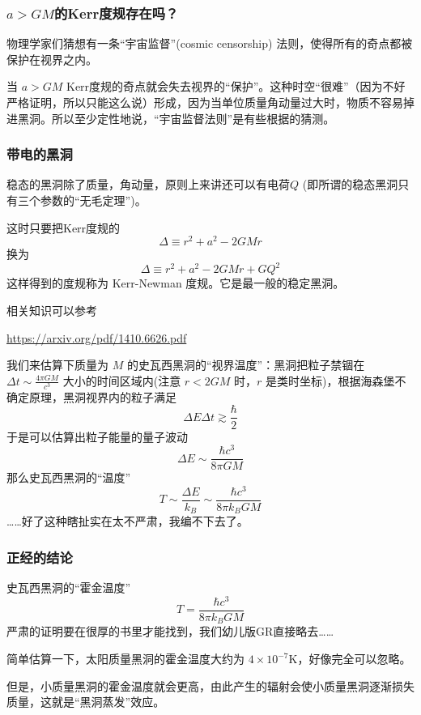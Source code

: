 \documentclass[CJK,13pt]{beamer}
\begin{document}
  \begin{frame}
    \frametitle{$a>GM$的Kerr度规存在吗？}
    物理学家们猜想有一条“宇宙监督”(cosmic censorship) 法则，使得所有的奇点都被保护在视界之内。

    \skipline
    
    当 $a>GM$ Kerr度规的奇点就会失去视界的“保护”。这种时空“很难”（因为不好严格证明，所以只能这么说）形成，因为当单位质量角动量过大时，物质不容易掉进黑洞。所以至少定性地说，“宇宙监督法则”是有些根据的猜测。
  \end{frame}  


    \begin{frame}
      \frametitle{带电的黑洞}
      稳态的黑洞除了质量，角动量，原则上来讲还可以有电荷$Q$ (即所谓的稳态黑洞只有三个参数的“无毛定理”)。

      这时只要把Kerr度规的
      $$\Delta \equiv r^2+a^2-2GMr$$
      换为
      $$\Delta \equiv r^2+a^2-2GMr+GQ^2$$
      这样得到的度规称为 Kerr-Newman 度规。它是最一般的稳定黑洞。


      \skipline

      相关知识可以参考

      \url{https://arxiv.org/pdf/1410.6626.pdf}
  \end{frame}  

    
    \begin{frame}
      我们来估算下质量为 $M$ 的史瓦西黑洞的“视界温度”：黑洞把粒子禁锢在 $\Delta t\sim \frac{4\pi GM}{c^3}$ 大小的时间区域内(注意 $r<2GM$ 时，$r$ 是类时坐标)，根据海森堡不确定原理，黑洞视界内的粒子满足
      $$\Delta E \Delta t \gtrsim \frac{\hbar}{2}$$
      于是可以估算出粒子能量的量子波动
      $$\Delta E \sim \frac{\hbar c^3}{8\pi GM}$$
      那么史瓦西黑洞的``温度''
      $$T \sim \frac{\Delta E}{k_B} \sim \frac{\hbar c^3}{8\pi k_BGM}$$      
      ……好了这种瞎扯实在太不严肃，我编不下去了。
    \end{frame}

    \begin{frame}
      \frametitle{正经的结论}
      史瓦西黑洞的“霍金温度”
      {\blue $$ T = \frac{\hbar c^3}{8\pi k_BGM} $$}
      严肃的证明要在很厚的书里才能找到，我们幼儿版GR直接略去……

      \skipline
      
      简单估算一下，太阳质量黑洞的霍金温度大约为 $4\times 10^{-7}\mathrm{K}$，好像完全可以忽略。

      但是，小质量黑洞的霍金温度就会更高，由此产生的辐射会使小质量黑洞逐渐损失质量，这就是“黑洞蒸发”效应。
    \end{frame}
\end{document}
